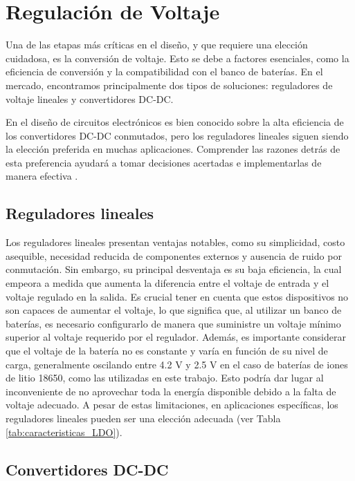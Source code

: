 \section{Regulación de Voltaje}

Una de las etapas más críticas en el diseño, y que requiere una elección cuidadosa, es la conversión de voltaje. Esto se debe a factores esenciales, como la eficiencia de conversión y la compatibilidad con el banco de baterías. En el mercado, encontramos principalmente dos tipos de soluciones: reguladores de voltaje lineales y convertidores DC-DC.

En el diseño de circuitos electrónicos es bien conocido sobre la alta eficiencia de los convertidores DC-DC conmutados, pero los reguladores lineales siguen siendo la elección preferida en muchas aplicaciones. Comprender las razones detrás de esta preferencia ayudará a tomar decisiones acertadas e implementarlas de manera efectiva \cite{digikey-linear-regulators}.

\subsection{Reguladores lineales}

Los reguladores lineales presentan ventajas notables, como su simplicidad, costo asequible, necesidad reducida de componentes externos y ausencia de ruido por conmutación. Sin embargo, su principal desventaja es su baja eficiencia, la cual empeora a medida que aumenta la diferencia entre el voltaje de entrada y el voltaje regulado en la salida. Es crucial tener en cuenta que estos dispositivos no son capaces de aumentar el voltaje, lo que significa que, al utilizar un banco de baterías, es necesario configurarlo de manera que suministre un voltaje mínimo superior al voltaje requerido por el regulador. Además, es importante considerar que el voltaje de la batería no es constante y varía en función de su nivel de carga, generalmente oscilando entre 4.2 V y 2.5 V en el caso de baterías de iones de litio 18650, como las utilizadas en este trabajo. Esto podría dar lugar al inconveniente de no aprovechar toda la energía disponible debido a la falta de voltaje adecuado. A pesar de estas limitaciones, en aplicaciones específicas, los reguladores lineales pueden ser una elección adecuada (ver Tabla \ref{tab:caracteristicas_LDO}).


\subsection{Convertidores DC-DC}

